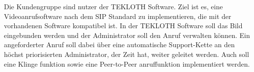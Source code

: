 Die Kundengruppe sind nutzer der TEKLOTH Software.
Ziel ist es, eine Videoanrufsoftware nach dem SIP Standard zu implementieren, die mit der vorhandenen Software kompatibel ist.
In der TEKLOTH Software soll das Bild eingebunden werden und der Administrator soll den Anruf verwalten können.
Ein angeforderter Anruf soll dabei über eine automatische Support-Kette an den höchst priorisierten Administrator, der Zeit hat, weiter geleitet werden.
Auch soll eine Klinge funktion sowie eine Peer-to-Peer anruffunktion implementiert werden.
